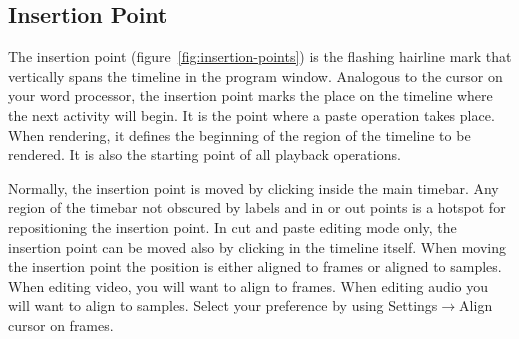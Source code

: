 \subsection{Insertion Point}%
\label{sub:insertion_point}

The insertion point (figure~\ref{fig:insertion-points}) is the flashing hairline mark that vertically spans the timeline in the program window. 
Analogous to the cursor on your word processor, the insertion point marks the place on the timeline where the next activity will begin. 
It is the point where a paste operation takes place. 
When rendering, it defines the beginning of the region of the timeline to be rendered. It is also the starting point of all playback operations.

Normally, the insertion point is moved by clicking inside the main timebar. 
Any region of the timebar not obscured by labels and in or out points is a hotspot for repositioning the insertion point. 
In cut and paste editing mode only, the insertion point can be moved also by clicking in the timeline itself. 
When moving the insertion point the position is either aligned to frames or aligned to samples. 
When editing video, you will want to align to frames. When editing audio you will want to align to samples. Select your preference by using Settings$\rightarrow$Align cursor on frames.

